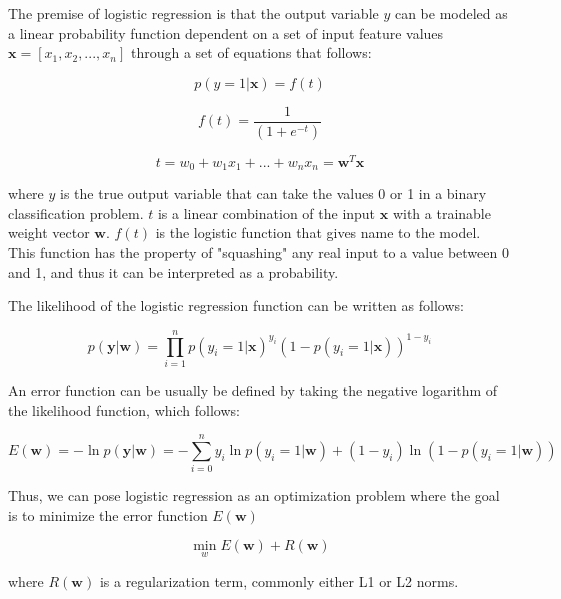 \documentclass{kththesis}
\begin{document}
The premise of logistic regression is that the output variable $y$ can be modeled as a linear probability function dependent on a set of input feature values  $\mathbf{x} = [x_1, x_2, ..., x_n]$ through a set of equations that follows:

\begin{equation}
p(y = 1|\mathbf{x}) = f(t)
\end{equation}

\begin{equation}
f(t) = \frac{1}{(1+e^{-t})}
\end{equation}

\begin{equation}
t = w_0 + w_1x_1 + ... + w_nx_n = \mathbf{w}^T\mathbf{x}
\end{equation}

where $y$ is the true output variable that can take the values 0 or 1 in a binary classification problem. $t$ is a linear combination of the input $\bm{x}$ with a trainable weight vector $\mathbf{w}$. $f(t)$ is the logistic function that gives name to the model. This function has the property of "squashing" any real input to a value between 0 and 1, and thus it can be interpreted as a probability. 

The likelihood of the logistic regression function can be written as follows:

\begin{equation}
p(\mathbf{y}|\mathbf{w}) = \prod_{i=1}^{n}  p(y_i=1|\mathbf{x})^{y_i} (1-p(y_i=1|\mathbf{x}))^{1-y_i}
\end{equation}

An error function can be usually be defined by taking the negative logarithm of the likelihood function, which follows:

\begin{equation}
E(\mathbf{w}) = -\ln p(\mathbf{y}|\mathbf{w}) = - \sum_{i=0}^{n} y_i \ln p(y_i=1|\mathbf{w}) + (1-y_i) \ln (1 - p(y_i=1|\mathbf{w}))
\end{equation}

Thus, we can pose logistic regression as an optimization problem where the goal is to minimize the error function $E(\mathbf{w})$ 

\begin{equation}
\displaystyle{\min_w} E(\mathbf{w}) + R(\mathbf{w})
\end{equation}

where $R(\mathbf{w})$ is a regularization term, commonly either L1 or L2 norms.
\end{document}
